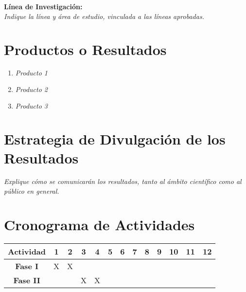 \documentclass[12pt,a4paper]{article}
\begin{document}
\noindent
\textbf{Línea de Investigación:} \\
\textit{Indique la línea y área de estudio, vinculada a las líneas aprobadas.}

\section{Productos o Resultados}
\noindent
\begin{enumerate}
    \item \textit{Producto 1}
    \item \textit{Producto 2}
    \item \textit{Producto 3}
\end{enumerate}

\section{Estrategia de Divulgación de los Resultados}
\noindent
\textit{Explique cómo se comunicarán los resultados, tanto al ámbito científico como al público en general.}

\section{Cronograma de Actividades}
\begin{center}
\begin{tabular}{|c|c|c|c|c|c|c|c|c|c|c|c|c|}
\hline
\textbf{Actividad} & 1 & 2 & 3 & 4 & 5 & 6 & 7 & 8 & 9 & 10 & 11 & 12 \\
\hline
\textbf{Fase I} & X & X &  &  &  &  &  &  &  &  &  &  \\
\hline
\textbf{Fase II} &  &  & X & X &  &  &  &  &  &  &  &  \\
\hline
\end{tabular}
\end{center}

\end{document}
